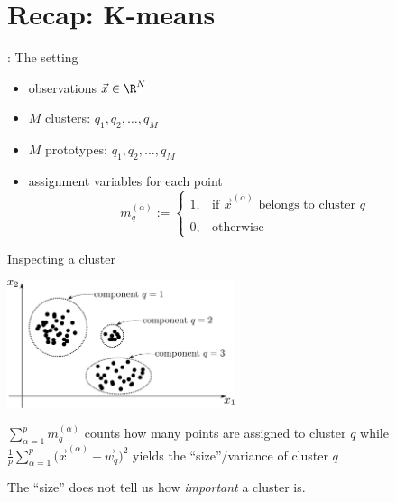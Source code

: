\section{Recap: K-means}


\begin{frame}{\secname: The setting}

\begin{itemize}
\item[] observations $\vec x \in \R^N$
\item[] $M$ clusters: $q_1, q_2, \ldots, q_M$
\item[] $M$ prototypes: $q_1, q_2, \ldots, q_M$
\item[] assignment variables for each point
\begin{equation}
\label{eq:assignment}
	m_q^{(\alpha)} := \left\{ \begin{array}{ll}
		1, & \text{if } \vec{x}^{(\alpha)} \text{ belongs to cluster } q
		\\\\
		0, & \text{otherwise}
	\end{array} \right. 
\end{equation}

\end{itemize}

\end{frame}

\begin{frame}{Inspecting a cluster}

\begin{center}
	\includegraphics[width=0.5\textwidth]{img/fig1}
\end{center}

$\sum_{\alpha=1}^p m_q^{(\alpha)}$ counts how many points are assigned to cluster $q$ while $\frac{1}{p} \sum_{\alpha=1}^{p}
		\big( \vec{x}^{(\alpha)} - \vec{w}_q \big)^2$ yields the ``size''/variance of cluster $q$
		
\pause

\svspace{5mm}

The ``size'' does not tell us how \textit{important} a cluster is.

\end{frame}

